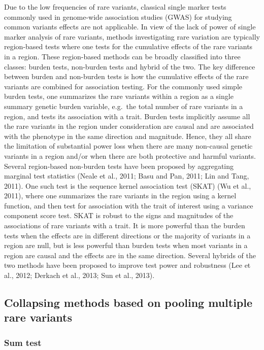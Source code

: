 \documentclass[]{book}
\theoremstyle{definition}
\theoremstyle{definition}
\theoremstyle{definition}
\theoremstyle{remark}
\begin{document}
Due to the low frequencies of rare variants, classical single marker
tests commonly used in genome-wide association studies (GWAS) for
studying common variants effects are not applicable. In view of the lack
of power of single marker analysis of rare variants, methods
investigating rare variation are typically region-based tests where one
tests for the cumulative effects of the rare variants in a region. These
region-based methods can be broadly classified into three classes:
burden tests, non-burden tests and hybrid of the two. The key difference
between burden and non-burden tests is how the cumulative effects of the
rare variants are combined for association testing. For the commonly
used simple burden tests, one summarizes the rare variants within a
region as a single summary genetic burden variable, e.g.~the total
number of rare variants in a region, and tests its association with a
trait. Burden tests implicitly assume all the rare variants in the
region under consideration are causal and are associated with the
phenotype in the same direction and magnitude. Hence, they all share the
limitation of substantial power loss when there are many non-causal
genetic variants in a region and/or when there are both protective and
harmful variants. Several region-based non-burden tests have been
proposed by aggregating marginal test statistics (Neale et al., 2011;
Basu and Pan, 2011; Lin and Tang, 2011). One such test is the sequence
kernel association test (SKAT) (Wu et al., 2011), where one summarizes
the rare variants in the region using a kernel function, and then test
for association with the trait of interest using a variance component
score test. SKAT is robust to the signs and magnitudes of the
associations of rare variants with a trait. It is more powerful than the
burden tests when the effects are in different directions or the
majority of variants in a region are null, but is less powerful than
burden tests when most variants in a region are causal and the effects
are in the same direction. Several hybrids of the two methods have been
proposed to improve test power and robustness (Lee et al., 2012; Derkach
et al., 2013; Sun et al., 2013).

\subsection{Collapsing methods based on pooling multiple rare
variants}\label{collapsing-methods-based-on-pooling-multiple-rare-variants}

\subsubsection{Sum test}\label{sum-test}
\end{document}
